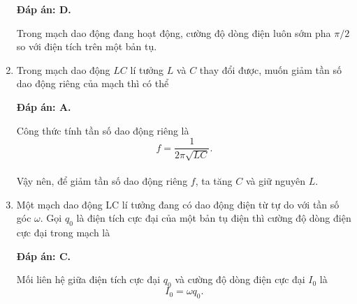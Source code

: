 \begin{enumerate}[label=\bfseries Câu \arabic*:]
	\hideall
	{		\textbf{Đáp án: D.}
		
		Trong mạch dao động đang hoạt động, cường độ dòng điện luôn sớm pha $\pi /2$ so với điện tích trên một bản tụ.
		
	}
	
	\item {}
	
	{Trong mạch dao động  $LC$ lí tưởng $L$ và $C$ thay đổi được, muốn giảm tần số dao động riêng của mạch thì có thể
	}
	
	\hideall
	{		\textbf{Đáp án: A.}
		
		Công thức tính tần số dao động riêng là
		$$
		f = \dfrac{1}{2\pi \sqrt{LC}}.
		$$ \\
		Vậy nên, để giảm tần số dao động riêng $f$, ta tăng $C$ và giữ nguyên $L$.
	}
	
	\item {}
	
	{Một mạch dao động LC lí tưởng đang có dao động điện từ tự do với tần số góc $\omega$. Gọi $q_0$ là điện tích cực đại của một bản tụ điện thì cường độ dòng điện cực đại trong mạch là
	}
	
	\hideall
	{		\textbf{Đáp án: C.}
		
		Mối liên hệ giữa điện tích cực đại $q_0$ và cường độ dòng điện cực đại $I_0$ là
		$$
		I_0 = \omega q_0.
		$$
		
}
\end{enumerate}
